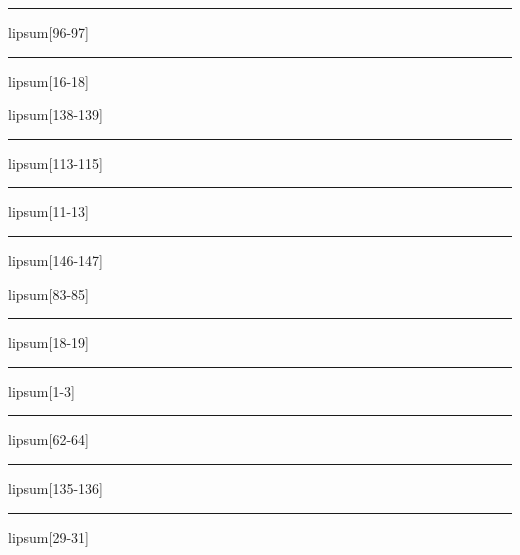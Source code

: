 \documentclass[11pt,a4paper]{article}
\begin{document}
\begin{simplewrap}
  \textcolor{red!12}{\rule{4.7cm}{7.5cm}}
\end{simplewrap}
lipsum[96-97]

\begin{simplewrap}
  \textcolor{magenta!20}{\rule{4.5cm}{7.5cm}}
\end{simplewrap}
lipsum[16-18]

lipsum[138-139]

\begin{simplewrap}
  \textcolor{orange!18}{\rule{4.5cm}{4.5cm}}
\end{simplewrap}
lipsum[113-115]

\begin{simplewrap}
  \textcolor{red!54}{\rule{4.1cm}{7.8cm}}
\end{simplewrap}
lipsum[11-13]

\begin{simplewrap}
  \textcolor{blue!45}{\rule{3.9cm}{7.6cm}}
\end{simplewrap}
lipsum[146-147]

lipsum[83-85]

\begin{simplewrap}
  \textcolor{blue!27}{\rule{5.6cm}{6.8cm}}
\end{simplewrap}
lipsum[18-19]

\begin{simplewrap}
  \textcolor{blue!28}{\rule{5.5cm}{6.3cm}}
\end{simplewrap}
lipsum[1-3]

\begin{simplewrap}
  \textcolor{cyan!34}{\rule{5.2cm}{9.1cm}}
\end{simplewrap}
lipsum[62-64]

\begin{simplewrap}
  \textcolor{green!52}{\rule{5.9cm}{8.6cm}}
\end{simplewrap}
lipsum[135-136]

\begin{simplewrap}
  \textcolor{magenta!19}{\rule{4.8cm}{4.6cm}}
\end{simplewrap}
lipsum[29-31]
\end{document}
